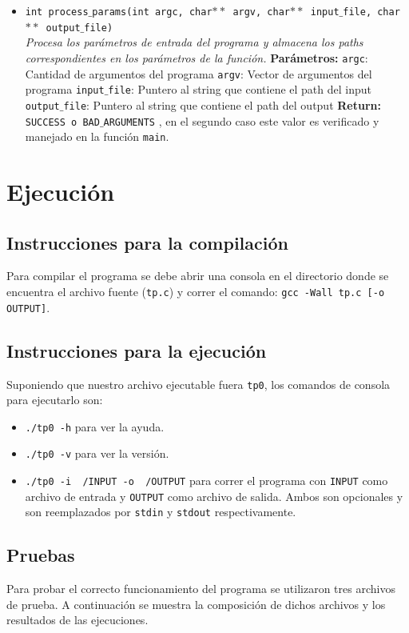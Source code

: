 \documentclass[a4paper, 10pt]{article}
\def\code#1{\texttt{#1}}
\begin{document}
\begin{itemize}
				\item \code{int process$\_$params(int argc, char$**$ argv, 
				char$**$ input$\_$file, char$**$ output$\_$file)} 
				\\\textit{Procesa los parámetros de entrada del programa y almacena 
				los paths correspondientes en los parámetros de la función.}
					\subitem \textbf{Parámetros:} 
						\subsubitem \code{argc}: Cantidad de argumentos del programa
						\subsubitem \code{argv}: Vector de argumentos del programa
						\subsubitem \code{input$\_$file}: Puntero al string que contiene el path 
						del input
						\subsubitem \code{output$\_$file}: Puntero al string que contiene el path 
						del output
					\subitem \textbf{Return:} 
						\subsubitem \code{SUCCESS o BAD$\_$ARGUMENTS} , en el segundo caso este valor 
						es verificado y manejado en la función \code{main}.
				
												
			\end{itemize}				
	\section{Ejecución}
		\subsection{Instrucciones para la compilación}
			Para compilar el programa se debe abrir una consola en el directorio donde se encuentra el archivo
			fuente (\code{tp.c}) y correr el comando: \code{gcc -Wall tp.c [-o OUTPUT]}.
		\subsection{Instrucciones para la ejecución}
			Suponiendo que nuestro archivo ejecutable fuera \code{tp0}, los comandos de consola para ejecutarlo
			son:
			\begin{itemize}
				\item \code{./tp0 -h} para ver la ayuda.
				\item \code{./tp0 -v} para ver la versión.
				\item \code{./tp0 -i ~/INPUT -o ~/OUTPUT}  para correr el programa con \code{INPUT} como archivo de entrada
				y \code{OUTPUT} como archivo de salida. Ambos son opcionales y son reemplazados por \code{stdin} y \code{stdout}
				respectivamente.
			\end{itemize}
		\subsection{Pruebas}
			Para probar el correcto funcionamiento del programa se utilizaron tres archivos de prueba. A continuación
			se muestra la composición de dichos archivos y los resultados de las ejecuciones.
\end{document}
